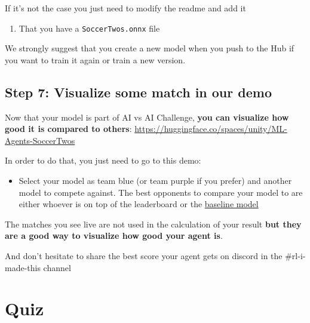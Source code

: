\documentclass[11pt,a4paper]{article}
\begin{document}
If it's not the case you just need to modify the readme and add it


\begin{enumerate}
\def\labelenumi{\arabic{enumi}.}
\setcounter{enumi}{1}
\tightlist
\item
  That you have a \texttt{SoccerTwos.onnx} file
\end{enumerate}


We strongly suggest that you create a new model when you push to the Hub if you want to train it again or train a new version.

\subsection{Step 7: Visualize some match in our demo}\label{step-7-visualize-some-match-in-our-demo}

Now that your model is part of AI vs AI Challenge, \textbf{you can visualize how good it is compared to others}: \url{https://huggingface.co/spaces/unity/ML-Agents-SoccerTwos}

In order to do that, you just need to go to this demo:

\begin{itemize}
\tightlist
\item
  Select your model as team blue (or team purple if you prefer) and another model to compete against. The best opponents to compare your model to are either whoever is on top of the leaderboard or the \href{https://huggingface.co/unity/MLAgents-SoccerTwos}{baseline model}
\end{itemize}

The matches you see live are not used in the calculation of your result \textbf{but they are a good way to visualize how good your agent is}.

And don't hesitate to share the best score your agent gets on discord in the \#rl-i-made-this channel

\section{Quiz}\label{quiz}
\end{document}
